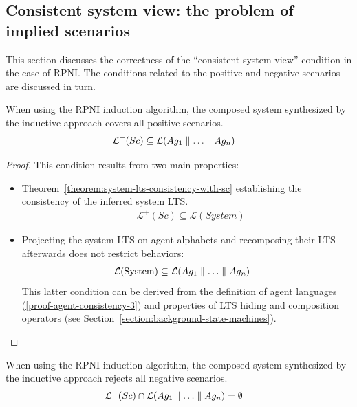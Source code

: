 
\subsection{Consistent system view: the problem of implied scenarios\label{subsection:consistent-system-view}}

This section discusses the correctness of the ``consistent system view'' condition in the case of RPNI. The conditions related to the positive and negative scenarios are discussed in turn.

\begin{theorem}
When using the RPNI induction algorithm, the composed system synthesized by the inductive approach covers all positive scenarios.
\begin{align*}
&\mathcal{L}^+(Sc) \subseteq \mathcal{L}(Ag_1 \parallel \ldots \parallel Ag_n)
\end{align*}

\begin{proof}
This condition results from two main properties:
\begin{itemize}
\item Theorem~\ref{theorem:system-lts-consistency-with-sc} establishing the consistency of the inferred system LTS.
\begin{align*}
&\mathcal{L}^+(Sc) \subseteq \mathcal{L}(System)
\end{align*}
\item Projecting the system LTS on agent alphabets and recomposing their LTS afterwards does not restrict behaviors:
\begin{align*}
&\mathcal{L}(\mbox{System}) \subseteq \mathcal{L}(Ag_1 \parallel \ldots \parallel Ag_n)
\end{align*}
This latter condition can be derived from the definition of agent languages (\ref{proof-agent-consistency-3}) and properties of LTS hiding and composition operators (see Section~\ref{section:background-state-machines}).
\end{itemize} 

\end{proof}
\end{theorem}

\begin{theorem}[Candidate]
When using the RPNI induction algorithm, the composed system synthesized by the inductive approach rejects all negative scenarios.\label{theorem:consistent-system-view-negative}
\begin{align*}
&\mathcal{L}^-(Sc) \cap \mathcal{L}(Ag_1 \parallel \ldots \parallel Ag_n) = \emptyset
\end{align*}
\end{theorem}

